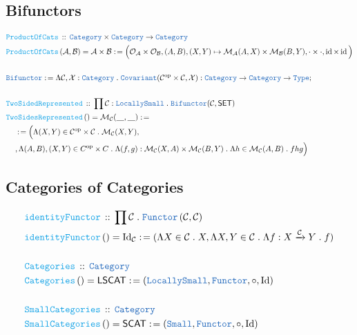 \documentclass[12pt]{scrartcl}
\newcommand{\TYPE}[1]{\textcolor{NavyBlue}{\mathtt{#1}}}
\newcommand{\FUNC}[1]{\textcolor{Cerulean}{\mathtt{#1}}}
\renewcommand{\.}{\; . \;}
\newcommand{\de}{: \kern 0.1pc =}
\newcommand{\Act}[1]{\left( #1 \right)}
\newcommand{\DeclareFunc}[2]{& \FUNC{#1} \, :: \, #2 \\}
\newcommand{\DefineNamedFunc}[4]{&  \FUNC{#1}\Act{#2} = #3 \de #4 \\}
\newcommand{\NewLine}{\\ & \kern 1pc}
\newcommand{\Page}[1]{ \begin{align*} #1 \end{align*}   }
\newcommand{\Type}{\TYPE{Type}}
\DeclareMathOperator*{\id}{id}
\newcommand{\Cat}{\TYPE{Category}}
\newcommand{\Mor}{\mathcal{M}}
\newcommand{\Obj}{\mathcal{O}}
\newcommand{\Func}[2]{\TYPE{Functor}\left( #1, #2 \right)}
\newcommand{\Arrow}{\xrightarrow}
\newcommand{\Conclude}[3]{& #1 \de #2 : #3; \\}
\newcommand{\Cov}{\TYPE{Covariant}}
\newcommand{\op}{\mathrm{op}}
\newcommand{\C}{\mathcal{C}}
\newcommand{\SET}{\mathsf{SET}}
\begin{document}
\subsection{Bifunctors}
\Page{
	\DeclareFunc{ProductOfCats}{\Cat \times \Cat \to \Cat}
	\DefineNamedFunc{ProductOfCats}{\mathcal{A},\mathcal{B}}
	{\mathcal{A} \times \mathcal{B}}{\Big( \Obj_{\mathcal{A}} \times \Obj_{\mathcal{B}},   
		(A,B),(X,Y) \mapsto \Mor_{\mathcal{A}}(A,X) \times \Mor_{\mathcal{B}}(B,Y), \cdot \times \cdot, \id \times \id
	\Big)}
	\\
	\Conclude{\TYPE{Bifunctor}}{\Lambda \C, \mathcal{X} : \Cat \. \Cov(\C^\op \times \C,\mathcal{X})}{\Cat \to \Cat \to \Type}
	\\
	\DeclareFunc{TwoSidedRepresented}{\prod \C : \TYPE{LocallySmall} \. \TYPE{Bifunctor}(\C,\SET) }
	\DefineNamedFunc{TwoSidesRepresented}{  }{\Mor_\C(\underline{\quad},\underline{\quad})}{  
		\NewLine \de \Big( \Lambda  (X,Y) \in \C^\op \times \C \. \Mor_\C(X,Y), 
		 \NewLine ,	\Lambda (A,B),(X,Y) \in C^\op \times C  \. \Lambda (f,g) : \Mor_\C(X,A)\times \Mor_\C(B,Y) \.
		\Lambda h \in \Mor_\C(A,B) \. fhg 	\Big)
	}
}
\newpage
\subsection{Categories of Categories}
\Page{
	\DeclareFunc{identityFunctor}{\prod \C \. \Func{\C}{\C}}
	\DefineNamedFunc{identityFunctor}{}{ \mathrm{Id}_\C }{ ( \Lambda X \in \C \. X,
		\Lambda X,Y \in \C \. \Lambda f : X \Arrow{\C} Y\. f )}
	\\
	\DeclareFunc{Categories}{\Cat}
	\DefineNamedFunc{Categories}{}{\mathsf{LSCAT}}{ ( \TYPE{LocallySmall}, \TYPE{Functor}, \circ, \mathrm{Id} )}
	\\
	\DeclareFunc{SmallCategories}{\Cat}
	\DefineNamedFunc{SmallCategories}{}{\mathsf{SCAT}}{ ( \TYPE{Small}, \TYPE{Functor}, \circ, \mathrm{Id} )}
}
\newpage
\end{document}

